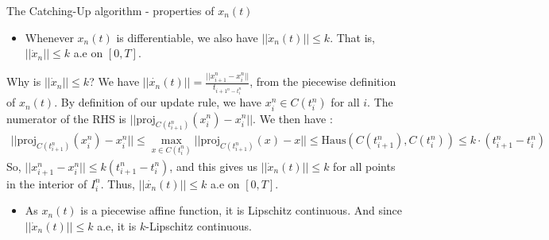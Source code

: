 \documentclass[8pt,aspectratio=169]{beamer}
\begin{document}
\begin{frame}[fragile]{The Catching-Up algorithm - properties of $x_n(t)$}
    \begin{itemize}
        \item Whenever $x_n(t)$ is differentiable, we also have $||\dot{x}_n(t)|| \leq k$. That is, $||\dot{x}_n||\leq k$ a.e on $[0, T]$.
    \end{itemize}
    \begin{block}{Why is $||\dot{x}_n||\leq k$?}
        We have $||\dot{x_n}(t)|| = \frac{||x_{i+1}^n - x_i^n||}{t_{i+1^n - t_i^n}}$, from the piecewise definition of $x_n(t)$. By definition of our update rule, we have $x_i^n \in C(t_i^n)$ for all $i$. The numerator of the RHS is $||\text{proj}_{C(t_{i+1}^n)}(x_i^n) - x_i^n||$. We then have :
    \begin{align*}
        ||\text{proj}_{C(t_{i+1}^n)}(x_i^n) - x_i^n|| \leq \max_{x \in C(t_i^n)} ||\text{proj}_{C(t_{i+1}^n)}(x) - x|| \leq \text{Haus}(C(t_{i+1}^n), C(t_i^n)) \leq k\cdot (t_{i+1}^n - t_i^n)
    \end{align*}
    So, $||x_{i+1}^n - x_i^n|| \leq k(t_{i+1}^n - t_i^n)$, and this gives us $||\dot{x}_n(t)|| \leq k$ for all points in the interior of $I_i^n$. Thus, $||\dot{x_n}(t)|| \leq k $ a.e on $[0, T]$.
    \end{block}

    \begin{itemize}
        \item As $x_n(t)$ is a piecewise affine function, it is Lipschitz continuous. And since $||\dot{x}_n(t)||\leq k$ a.e, it is $k$-Lipschitz continuous.
    \end{itemize}
\end{frame}
\end{document}
